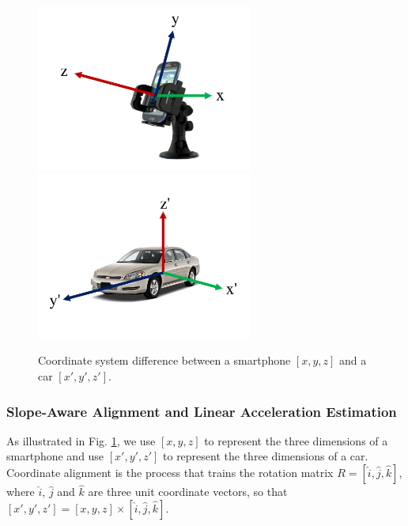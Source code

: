 

\begin{figure}[ht]
\center
\vspace{0.0cm}
\hspace{-0.5cm}
\includegraphics[width=2.8in,angle=0]{Figs/DriveSense/phone3d.pdf}
\vspace{0.0cm}
\hspace{-1.0cm}
\includegraphics[width=2.8in,angle=0]{Figs/DriveSense/car3d.pdf}
\vspace{-0.2cm}
\caption{Coordinate system difference between a smartphone $[x, y, z]$ and a car $[x', y', z']$.}
\vspace{0.2cm}
\label{coordinates}
\end{figure}


\subsubsection{Slope-Aware Alignment and Linear Acceleration Estimation}


As illustrated in Fig. \ref{coordinates}, we use 
$[x, y, z]$ to represent the three dimensions of a smartphone
and use $[x', y', z']$ to represent the three dimensions
of a car. 
Coordinate alignment is the process that trains the rotation
matrix $R = [\hat{i}, \hat{j}, \hat{k}]$, 
where $\hat{i}$, $\hat{j}$ and $\hat{k}$ are three unit coordinate vectors,
so that $[x', y', z'] = [x, y, z] \times [\hat{i}, \hat{j}, \hat{k}]$.




